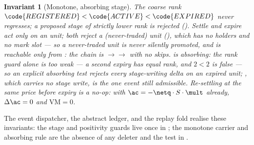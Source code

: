 \documentclass[11pt,a4paper]{article}
\newtheorem{invariant}[definition]{Invariant}
\begin{document}
\begin{invariant}[Monotone, absorbing stage]
The coarse rank $\code{REGISTERED}<\code{ACTIVE}<\code{EXPIRED}$ never regresses; a proposed stage of
strictly lower rank is rejected (). Settle and expire act only on an
 unit; both reject a  (never-traded) unit (), which has
no holders and no mark slot --- so a never-traded unit is never silently promoted, and 
is reachable only from : the chain is
$\to$$\to$ with no skips.  is
\emph{absorbing}: the rank guard alone is too weak --- a second expiry has equal rank, and $2<2$ is
false --- so an explicit absorbing test rejects every stage-writing delta on an expired unit;
, which carries no stage write, is the one event still admissible. Re-settling at the same
price before expiry is a no-op: with $\ac=-\netq\cdot S\cdot\mult$ already, $\Delta\ac=0$ and
$\mathrm{VM}=0$.
\end{invariant}

The event dispatcher, the abstract ledger, and the replay fold realise these invariants: the stage and
positivity guards live once in ; the monotone carrier and absorbing rule are the absence
of any deleter and the  test in .
\end{document}
